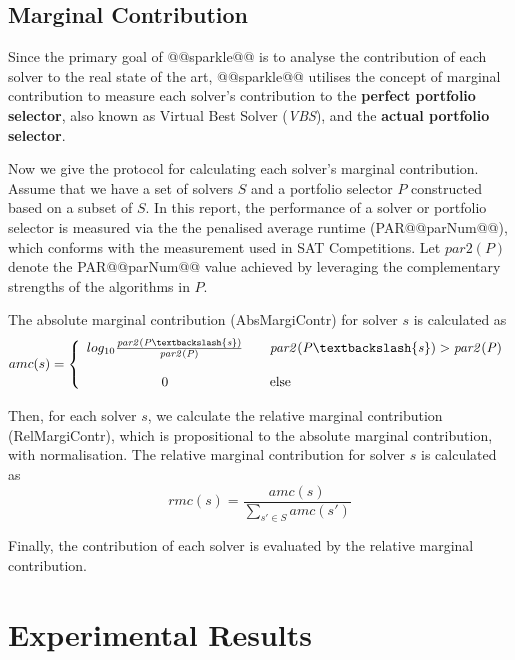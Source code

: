 \documentclass[british]{article}
\begin{document}
\subsection{Marginal Contribution}
\label{sec:Marginal_Contribution}

Since the primary goal of @@sparkle@@ is to analyse the contribution of each solver to the real state of the art, @@sparkle@@ utilises the concept of marginal contribution \cite{XuEtAl12} to measure each solver's contribution to the \textbf{perfect portfolio selector}, also known as Virtual Best Solver (\emph{VBS}), and the \textbf{actual portfolio selector}.

Now we give the protocol for calculating each solver's marginal contribution. Assume that we have a set of solvers $S$ and a portfolio selector $P$ constructed based on a subset of $S$. In this report, the performance of a solver or portfolio selector is measured via the the penalised average runtime (PAR@@parNum@@), which conforms with the measurement used in SAT Competitions. Let $\mathit{par2(P)}$ denote the PAR@@parNum@@ value achieved by leveraging the complementary strengths of the algorithms in $P$.

The absolute marginal contribution (Abs\textunderscore Margi\textunderscore Contr) for solver $s$ is calculated as 
\begin{equation}
amc(s)=\left\{
\begin{array}{ccl}
log_{10}{\frac{\mathit{par2(P\textbackslash \{s\})}}{\mathit{par2(P)}}} & & \mathit{par2(P\textbackslash \{s\})}> \mathit{par2(P)} \\
& & \\
0 & & \text{else}
\end{array} \right.
\end{equation}


Then, for each solver $s$, we calculate the relative marginal contribution (Rel\textunderscore Margi\textunderscore Contr), which is propositional to the absolute marginal contribution, with normalisation. The relative marginal contribution for solver $s$ is calculated as 
\begin{equation}
\mathit{rmc(s)}=\frac{\mathit{amc(s)}}{\sum_{s' \in S}{amc(s')}}
\end{equation}

Finally, the contribution of each solver is evaluated by the relative marginal contribution.

\section{Experimental Results}
\label{sec:Experimental_Results}
\end{document}
